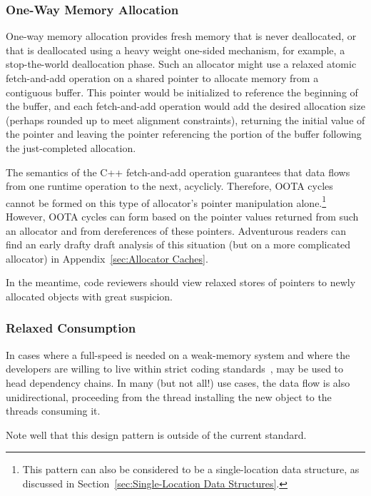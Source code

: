 \documentclass[10]{article}
\begin{document}
\subsubsection{One-Way Memory Allocation}
\label{sec:One-Way Memory Allocation}

One-way memory allocation provides fresh memory that is never deallocated,
or that is deallocated using a heavy weight one-sided mechanism, for
example, a stop-the-world deallocation phase.
Such an allocator might use a relaxed atomic fetch-and-add operation
on a shared pointer to allocate memory from a contiguous buffer.
This pointer would be initialized to reference the beginning of
the buffer, and each fetch-and-add operation would add the desired
allocation size (perhaps rounded up to meet alignment constraints),
returning the initial value of the pointer and leaving the pointer
referencing the portion of the buffer following the just-completed
allocation.

The semantics of the C++ fetch-and-add operation guarantees that
data flows from one runtime operation to the next, acyclicly.
Therefore, OOTA cycles cannot be formed on this type of allocator's
pointer manipulation alone.\footnote{
	This pattern can also be considered to be a
	single-location data structure, as discussed in
	Section~\ref{sec:Single-Location Data Structures}.}
However, OOTA cycles can form based on the pointer values returned from
such an allocator and from dereferences of these pointers.
Adventurous readers can find an early drafty draft analysis of this
situation (but on a more complicated allocator) in
Appendix~\ref{sec:Allocator Caches}.

In the meantime, code reviewers should view relaxed stores of pointers to
newly allocated objects with great suspicion.

\subsubsection{Relaxed Consumption}
\label{sec:Relaxed Consumption}

In cases where a full-speed  is needed on a
weak-memory system and where the developers are willing to live within
strict coding standards~\cite{PaulEMcKenney2014rcu-dereference},
 may be used to head dependency chains.
In many (but not all!) use cases, the data flow is also unidirectional,
proceeding from the thread installing the new object to the threads
consuming it.

Note well that this design pattern is outside of the current standard.
\end{document}
